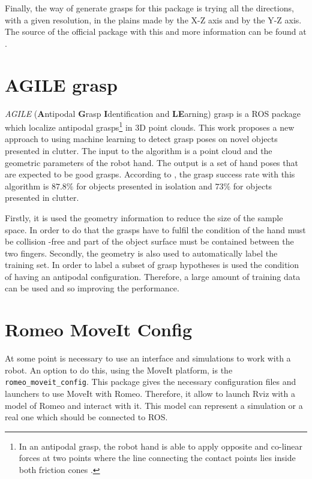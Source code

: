 \documentclass[12pt,a4paper,final,twoside,openright]{report}
\begin{document}
Finally, the way of generate grasps for this package is trying all the directions, with a given resolution, in the plains made by the X-Z axis and by the Y-Z axis. The source of the official package with this and more information can be found at \cite{gitMoveitSimpleGrasp}.

\section{AGILE grasp}
\label{sec:agile grasp}

\textit{AGILE} (\textbf{A}ntipodal \textbf{G}rasp \textbf{I}dentification and \textbf{LE}arning) grasp is a ROS package \cite{Pas} which localize antipodal grasps\footnote{In an antipodal grasp, the robot hand is able to apply opposite and co-linear forces at two points where the line connecting the contact points lies inside both friction cones \cite{DBLP:journals/corr/PasP15}.} in 3D point clouds. This work \cite{DBLP:journals/corr/PasP15} proposes a new approach to using machine learning to detect grasp poses on novel objects presented in clutter. The input to the algorithm is a point cloud and the geometric parameters of the robot hand. The output is a set of hand poses that are expected to be good grasps. According to \cite{DBLP:journals/corr/PasP15}, the grasp success rate with this algorithm is $87.8 \%$ for objects presented in isolation and $73 \%$ for objects presented in clutter. 

Firstly, it is used the geometry information to reduce the size of the sample space. In order to do that the grasps have to fulfil the condition of the hand must be collision -free and part of the object surface must be contained between the two fingers. Secondly, the geometry is also used to automatically label the training set. In order to label a subset of grasp hypotheses is used the condition of having an antipodal configuration. Therefore, a large amount of training data can be used and so improving the performance.

\section{Romeo MoveIt Config}
\label{sec:romeo_moveit_config}

At some point is necessary to use an interface and simulations to work with a robot. An option to do this, using the MoveIt platform, is the \texttt{romeo\_moveit\_config}. This package gives the necessary configuration files and launchers to use MoveIt with Romeo. Therefore, it allow to launch Rviz with a model of Romeo and interact with it. This model can represent a simulation or a real one which should be connected to ROS.
\end{document}
